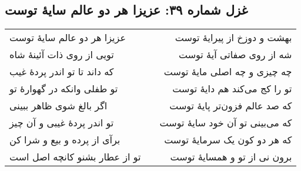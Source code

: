 \begin{center}
\section*{غزل شماره ۳۹: عزیزا هر دو عالم سایهٔ توست}
\label{sec:039}
\begin{longtable}{l p{0.5cm} r}
عزیزا هر دو عالم سایهٔ توست
&&
بهشت و دوزخ از پیرایهٔ توست
\\
تویی از روی ذات آئینهٔ شاه
&&
شه از روی صفاتی آیهٔ توست
\\
که داند تا تو اندر پردهٔ غیب
&&
چه چیزی و چه اصلی مایهٔ توست
\\
تو طفلی وانکه در گهوارهٔ تو
&&
تو را کج می‌کند هم دایهٔ توست
\\
اگر بالغ شوی ظاهر ببینی
&&
که صد عالم فزون‌تر پایهٔ توست
\\
تو اندر پردهٔ غیبی و آن چیز
&&
که می‌بینی تو آن خود سایهٔ توست
\\
برآی از پرده و بیع و شرا کن
&&
که هر دو کون یک سرمایهٔ توست
\\
تو از عطار بشنو کانچه اصل است
&&
برون نی از تو و همسایهٔ توست
\\
\end{longtable}
\end{center}

